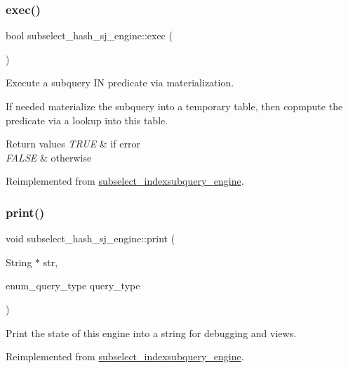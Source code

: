 \subsubsection{\texorpdfstring{exec()}{exec()}}
{\footnotesize\ttfamily bool subselect\+\_\+hash\+\_\+sj\+\_\+engine\+::exec (\begin{DoxyParamCaption}{ }\end{DoxyParamCaption})\hspace{0.3cm}{\ttfamily [virtual]}}

Execute a subquery IN predicate via materialization.

If needed materialize the subquery into a temporary table, then copmpute the predicate via a lookup into this table.


\begin{DoxyRetVals}{Return values}
{\em T\+R\+UE} & if error \\
\hline
{\em F\+A\+L\+SE} & otherwise \\
\hline
\end{DoxyRetVals}


Reimplemented from \mbox{\hyperlink{classsubselect__indexsubquery__engine}{subselect\+\_\+indexsubquery\+\_\+engine}}.

\mbox{\label{classsubselect__hash__sj__engine_a5bf7f2070358f915ec2d959cd4bad4fa}} 
\subsubsection{\texorpdfstring{print()}{print()}}
{\footnotesize\ttfamily void subselect\+\_\+hash\+\_\+sj\+\_\+engine\+::print (\begin{DoxyParamCaption}\item[{String $\ast$}]{str,  }\item[{enum\+\_\+query\+\_\+type}]{query\+\_\+type }\end{DoxyParamCaption})\hspace{0.3cm}{\ttfamily [virtual]}}

Print the state of this engine into a string for debugging and views. 

Reimplemented from \mbox{\hyperlink{classsubselect__indexsubquery__engine}{subselect\+\_\+indexsubquery\+\_\+engine}}.

